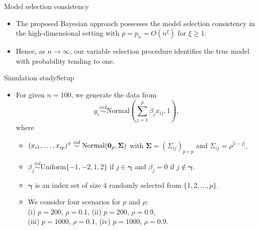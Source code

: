 \documentclass[citecolor=blue,10pt]{beamer}
\def\bg{{\boldsymbol \gamma}}
\def\T{{ \mathrm{\scriptscriptstyle T} }}
\def\uSigma{{\boldsymbol \Sigma}}
\newcommand{\0} {\mbox{\boldmath$0$}}
\begin{document}
\begin{frame}{Model selection consistency}

\begin{itemize}\itemsep=3mm
\item The proposed Bayesian approach possesses the model selection consistency in the high-dimensional setting with $p=p_n=O(n^\xi)$ for $\xi\geq 1$.
\item Hence, as $n\to \infty$, our variable selection procedure identifies the true model with probability tending to one.
\end{itemize}
\end{frame}


\begin{frame}{Simulation study}{Setup}
\begin{itemize}\itemsep=3mm
\item For given $n=100$, we generate the data from 
$$y_i\overset{ind}{\sim}\text{Normal}\left(\sum_{j=1}^p \beta_j x_{ij},1\right),$$
where 
\begin{itemize}\itemsep=3mm
\item $(x_{i1},\ldots,x_{ip})^\T \overset{iid}{\sim}\text{Normal}(\0_p,\uSigma)$ with $\uSigma=(\Sigma_{ij})_{p\times p}$ and $\Sigma_{ij}=\rho^{|i-j|}$,
\item $\beta_j \overset{iid}{\sim} \text{Uniform}\{-1,-2,1,2\}$ if $j\in \bg$ and $\beta_j=0$ if $j\notin \bg$. 
\item $\bg$ is an index set of size $4$ randomly selected from $\{1,2,\ldots,p\}$.
\item We consider four scenarios for $p$ and $\rho$: \\
(i) $p=200$, $\rho=0.1$, (ii) $p=200$, $\rho=0.9$,\\
 (iii) $p=1000$, $\rho=0.1$, (iv) $p=1000$, $\rho=0.9$. 
\end{itemize}
\end{itemize}
\end{frame}
\end{document}

